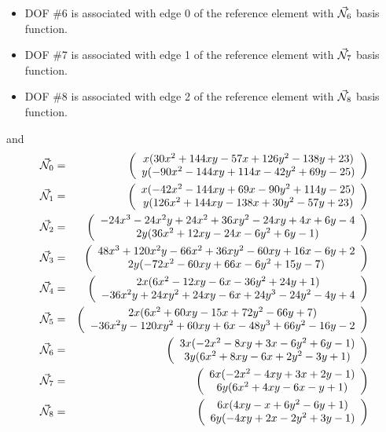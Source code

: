 \begin{itemize}
\begin{itemize}
\item DOF \#6 is associated with edge 0 of the reference element with $\vec{{\mathcal{N}}}_6$ basis function.
\item DOF \#7 is associated with edge 1 of the reference element with $\vec{{\mathcal{N}}}_7$ basis function.
\item DOF \#8 is associated with edge 2 of the reference element with $\vec{{\mathcal{N}}}_8$ basis function.
\end{itemize}
and
\begin{eqnarray}
\vec{{\mathcal{N}}}_0 &=&  \left(\begin{array}{c} 
x(30x^2+144xy-57x+126y^2-138y+23) \\ 
y(-90x^2-144xy+114x-42y^2+69y-25) 
\end{array}\right) \nonumber\\  
\vec{{\mathcal{N}}}_1 &=&  \left(\begin{array}{c}  
x(-42x^2-144xy+69x-90y^2+114y-25)\\
y(126x^2+144xy-138x+30y^2-57y+23)
\end{array}\right) \nonumber\\  
\vec{{\mathcal{N}}}_2 &=&  \left(\begin{array}{c}  
-24x^3-24x^2y+24x^2+36xy^2-24xy+4x+6y-4\\
2y(36x^2+12xy-24x-6y^2+6y-1)
\end{array}\right) \nonumber\\  
\vec{{\mathcal{N}}}_3 &=&  \left(\begin{array}{c}  
48x^3+120x^2y-66x^2+36xy^2-60xy+16x-6y+2 \\
2y(-72x^2-60xy+66x-6y^2+15y-7)
\end{array}\right) \nonumber\\  
\vec{{\mathcal{N}}}_4 &=&  \left(\begin{array}{c} 
2x(6x^2-12xy-6x-36y^2+24y+1)\\
-36x^2y+24xy^2+24xy-6x+24y^3-24y^2-4y+4 
\end{array}\right) \nonumber\\  
\vec{{\mathcal{N}}}_5 &=&  \left(\begin{array}{c}  
2x(6x^2+60xy-15x+72y^2-66y+7)\\
-36x^2y -120xy^2+60xy+6x-48y^3+66y^2-16y-2
\end{array}\right) \nonumber\\
\vec{{\mathcal{N}}}_6 &=&  \left(\begin{array}{c}  
3x(-2x^2-8xy+3x-6y^2+6y-1)\\
3y(6x^2+8xy-6x+2y^2-3y+1)
\end{array}\right) \nonumber\\
\vec{{\mathcal{N}}}_7 &=&  \left(\begin{array}{c}
6x(-2x^2-4xy+3x+2y-1) \\
6y(6x^2+4xy-6x-y+1)
\end{array}\right) \nonumber\\
\vec{{\mathcal{N}}}_8 &=&  \left(\begin{array}{c} 
6x(4xy-x+6y^2-6y+1) \\ 
6y(-4xy+2x-2y^2+3y-1) 
\end{array}\right) \nonumber
\end{eqnarray}


\end{itemize}
